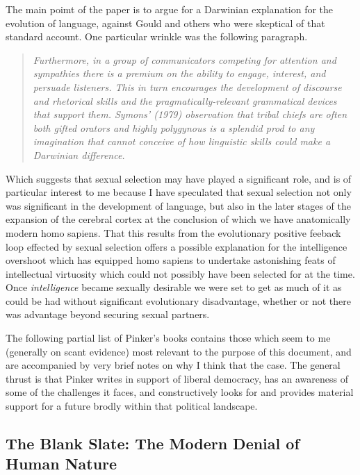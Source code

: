 \documentclass[10pt,titlepage]{book}
\begin{document}
The main poimt of the paper is to argue for a Darwinian explanation for the evolution of language, against Gould and others who were skeptical of that standard account.
One particular wrinkle was the following paragraph.

\begin{quote}
  {\it
  Furthermore, in a group of communicators competing for attention and sympathies there is a premium on
the ability to engage, interest, and persuade listeners. This in turn encourages the development of
discourse and rhetorical skills and the pragmatically-relevant grammatical devices that support them.
Symons' (1979) observation that tribal chiefs are often both gifted orators and highly polygynous is a
splendid prod to any imagination that cannot conceive of how linguistic skills could make a Darwinian
difference.}
\end{quote}

Which suggests that sexual selection may have played a significant role, and is of particular interest to me because I have speculated that sexual selection not only was significant in the development of language, but also in the later stages of the expansion of the cerebral cortex at the conclusion of which we have anatomically modern homo sapiens.
That this results from the evolutionary positive feeback loop effected by sexual selection offers a possible explanation for the intelligence overshoot which has equipped homo sapiens to undertake astonishing feats of intellectual virtuosity which could not possibly have been selected for at the time.
Once {\it intelligence} became sexually desirable we were set to get as much of it as could be had without significant evolutionary disadvantage, whether or not there was advantage beyond securing sexual partners.

The following partial list of Pinker's books contains those which seem to me (generally on scant evidence) most relevant to the purpose of this document, and are accompanied by very brief notes on why I think that the case.
The general thrust is that Pinker writes in support of liberal democracy, has an awareness of some of the challenges it faces, and constructively looks for and provides material support for a future brodly within that political landscape.

\subsection{The Blank Slate: The Modern Denial of Human Nature \cite{pinker-tbs}}
\end{document}
